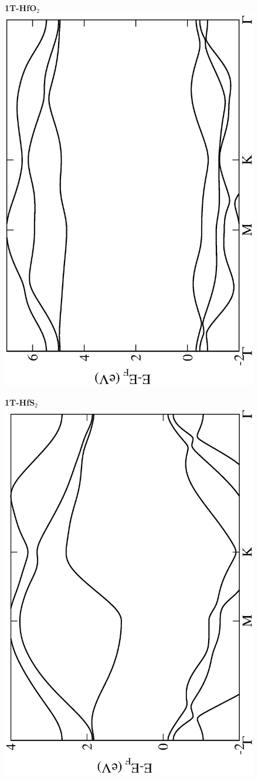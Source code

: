 \begin{figure}[htbp]
\centering
{\bfseries \sffamily 1T-HfO$_{2}$}\\
\includegraphics[width=0.45\linewidth, angle=-90, trim={2.9cm, 0cm, 2cm, 0cm}, clip]{img/SI_figs/BS/1T-HfO2.eps}
\end{figure}

\begin{figure}[htbp]
\centering
{\bfseries \sffamily 1T-HfS$_{2}$}\\
\includegraphics[width=0.45\linewidth, angle=-90, trim={2.9cm, 0cm, 2cm, 0cm}, clip]{img/SI_figs/BS/1T-HfS2.eps}
\end{figure}


